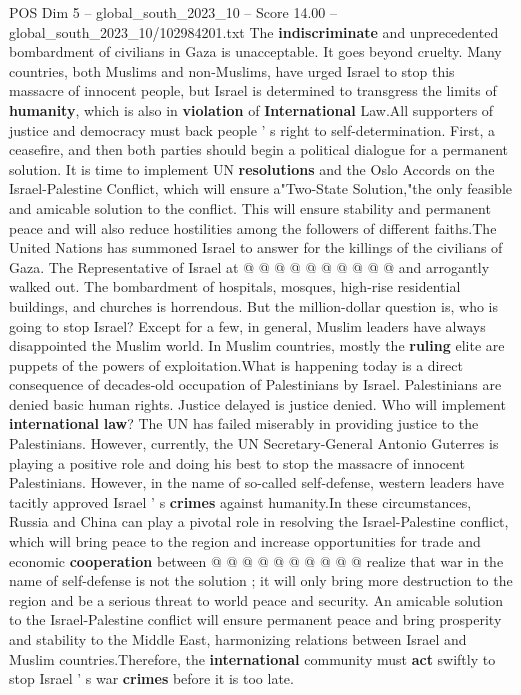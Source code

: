 \begin{textsample}{POS Dim 5 – global\_south\_2023\_10 – Score 14.00 – global\_south\_2023\_10/102984201.txt}
The \textbf{indiscriminate} and unprecedented bombardment of civilians in Gaza is unacceptable.
It goes beyond cruelty.
Many countries, both Muslims and non-Muslims, have urged Israel to stop this massacre of innocent people, but Israel is determined to transgress the limits of \textbf{humanity}, which is also in \textbf{violation} of \textbf{International} Law.All supporters of justice and democracy must back people ' s right to self-determination.
First, a ceasefire, and then both parties should begin a political dialogue for a permanent solution.
It is time to implement UN \textbf{resolutions} and the Oslo Accords on the Israel-Palestine Conflict, which will ensure a"Two-State Solution,"the only feasible and amicable solution to the conflict.
This will ensure stability and permanent peace and will also reduce hostilities among the followers of different faiths.The United Nations has summoned Israel to answer for the killings of the civilians of Gaza.
The Representative of Israel at @ @ @ @ @ @ @ @ @ @ and arrogantly walked out.
The bombardment of hospitals, mosques, high-rise residential buildings, and churches is horrendous.
But the million-dollar question is, who is going to stop Israel?
Except for a few, in general, Muslim leaders have always disappointed the Muslim world.
In Muslim countries, mostly the \textbf{ruling} elite are puppets of the powers of exploitation.What is happening today is a direct consequence of decades-old occupation of Palestinians by Israel.
Palestinians are denied basic human rights.
Justice delayed is justice denied.
Who will implement \textbf{international} \textbf{law}?
The UN has failed miserably in providing justice to the Palestinians.
However, currently, the UN Secretary-General Antonio Guterres is playing a positive role and doing his best to stop the massacre of innocent Palestinians.
However, in the name of so-called self-defense, western leaders have tacitly approved Israel ' s \textbf{crimes} against humanity.In these circumstances, Russia and China can play a pivotal role in resolving the Israel-Palestine conflict, which will bring peace to the region and increase opportunities for trade and economic \textbf{cooperation} between @ @ @ @ @ @ @ @ @ @ realize that war in the name of self-defense is not the solution ; it will only bring more destruction to the region and be a serious threat to world peace and security.
An amicable solution to the Israel-Palestine conflict will ensure permanent peace and bring prosperity and stability to the Middle East, harmonizing relations between Israel and Muslim countries.Therefore, the \textbf{international} community must \textbf{act} swiftly to stop Israel ' s war \textbf{crimes} before it is too late.

\end{textsample}
